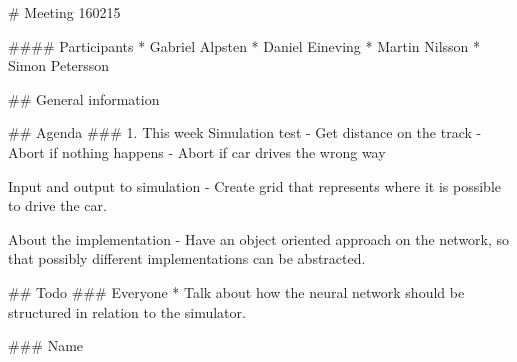 # Meeting 160215

#### Participants
* Gabriel Alpsten
* Daniel Eineving
* Martin Nilsson
* Simon Petersson

## General information

## Agenda
### 1. This week
Simulation test
 - Get distance on the track
 - Abort if nothing happens
 - Abort if car drives the wrong way
 
Input and output to simulation
 - Create grid that represents where it is possible to drive the car.

About the implementation
 - Have an object oriented approach on the network, so that possibly different implementations can be abstracted.

## Todo
### Everyone
* Talk about how the neural network should be structured in relation to the simulator.

### Name
